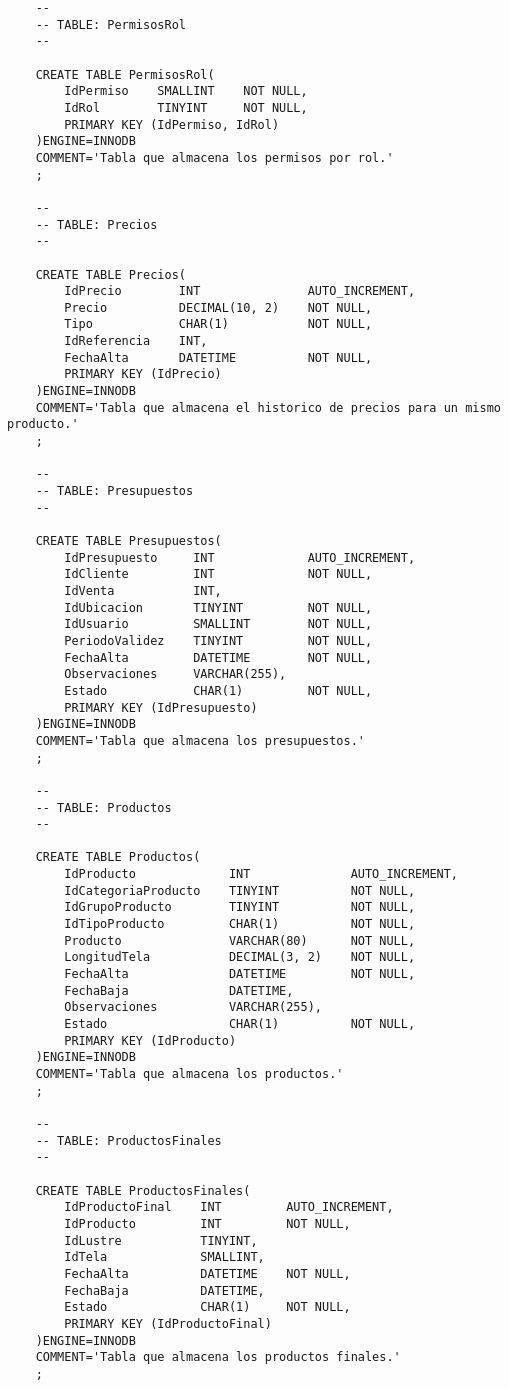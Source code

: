 \begin{lstlisting}
	-- 
	-- TABLE: PermisosRol 
	--

	CREATE TABLE PermisosRol(
		IdPermiso    SMALLINT    NOT NULL,
		IdRol        TINYINT     NOT NULL,
		PRIMARY KEY (IdPermiso, IdRol)
	)ENGINE=INNODB
	COMMENT='Tabla que almacena los permisos por rol.'
	;

	-- 
	-- TABLE: Precios 
	--

	CREATE TABLE Precios(
		IdPrecio        INT               AUTO_INCREMENT,
		Precio          DECIMAL(10, 2)    NOT NULL,
		Tipo            CHAR(1)           NOT NULL,
		IdReferencia    INT,
		FechaAlta       DATETIME          NOT NULL,
		PRIMARY KEY (IdPrecio)
	)ENGINE=INNODB
	COMMENT='Tabla que almacena el historico de precios para un mismo producto.'
	;

	-- 
	-- TABLE: Presupuestos 
	--

	CREATE TABLE Presupuestos(
		IdPresupuesto     INT             AUTO_INCREMENT,
		IdCliente         INT             NOT NULL,
		IdVenta           INT,
		IdUbicacion       TINYINT         NOT NULL,
		IdUsuario         SMALLINT        NOT NULL,
		PeriodoValidez    TINYINT         NOT NULL,
		FechaAlta         DATETIME        NOT NULL,
		Observaciones     VARCHAR(255),
		Estado            CHAR(1)         NOT NULL,
		PRIMARY KEY (IdPresupuesto)
	)ENGINE=INNODB
	COMMENT='Tabla que almacena los presupuestos.'
	;

	-- 
	-- TABLE: Productos 
	--

	CREATE TABLE Productos(
		IdProducto             INT              AUTO_INCREMENT,
		IdCategoriaProducto    TINYINT          NOT NULL,
		IdGrupoProducto        TINYINT          NOT NULL,
		IdTipoProducto         CHAR(1)          NOT NULL,
		Producto               VARCHAR(80)      NOT NULL,
		LongitudTela           DECIMAL(3, 2)    NOT NULL,
		FechaAlta              DATETIME         NOT NULL,
		FechaBaja              DATETIME,
		Observaciones          VARCHAR(255),
		Estado                 CHAR(1)          NOT NULL,
		PRIMARY KEY (IdProducto)
	)ENGINE=INNODB
	COMMENT='Tabla que almacena los productos.'
	;

	-- 
	-- TABLE: ProductosFinales 
	--

	CREATE TABLE ProductosFinales(
		IdProductoFinal    INT         AUTO_INCREMENT,
		IdProducto         INT         NOT NULL,
		IdLustre           TINYINT,
		IdTela             SMALLINT,
		FechaAlta          DATETIME    NOT NULL,
		FechaBaja          DATETIME,
		Estado             CHAR(1)     NOT NULL,
		PRIMARY KEY (IdProductoFinal)
	)ENGINE=INNODB
	COMMENT='Tabla que almacena los productos finales.'
	;


\end{lstlisting}

